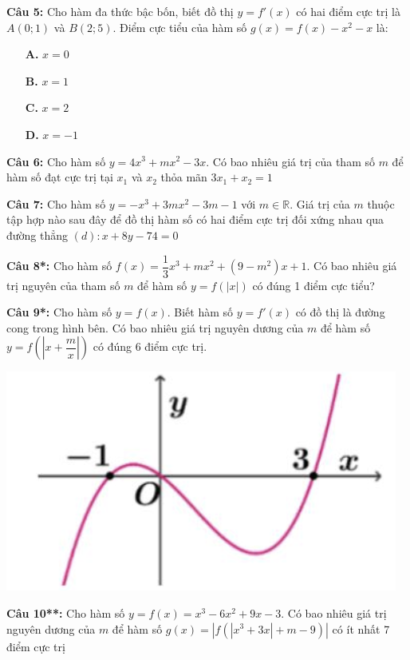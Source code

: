 \documentclass[12pt, a4paper]{article}
\begin{document}
\pagebreak		
	
		\textbf{Câu 5: } Cho hàm đa thức bậc bốn, biết đồ thị $y=f'(x)$ có hai điểm cực trị là $A(0;1)$ và $B(2;5)$. Điểm cực tiểu của hàm số $g(x)=f(x)-x^2-x$ là:
		\begin{multicols}{4}
			\begin{enumerate}
				\item[\textbf{A.}] $x=0$
				\item[\textbf{B.}] $x=1$
				\item[\textbf{C.}] $x=2$
				\item[\textbf{D.}] $x=-1$
			\end{enumerate}
		\end{multicols}
		
		\textbf{Câu 6: } Cho hàm số $y=4x^3+mx^2-3x$. Có bao nhiêu giá trị của tham số $m$ để hàm số đạt cực trị tại $x_1$ và $x_2$ thỏa mãn $3x_1+x_2=1$
		
		\textbf{Câu 7: } Cho hàm số $y=-x^3+3mx^2-3m-1$ với $m \in \mathbb{R}$. Giá trị của $m$ thuộc tập hợp nào sau đây để đồ thị hàm số có hai điểm cực trị đối xứng nhau qua đường thẳng $(d):x+8y-74=0$
		
		\textbf{Câu 8*: } Cho hàm số $f(x)=\dfrac{1}{3}x^3 +mx^2+(9-m^2)x+1$. Có bao nhiêu giá trị nguyên của tham số $m$ để hàm số $y=f(|x|)$ có đúng 1 điểm cực tiểu?
		
		\textbf{Câu 9*: } Cho hàm số $y=f(x)$. Biết hàm số $y=f'(x)$ có đồ thị là đường cong trong hình bên. Có bao nhiêu giá trị nguyên dương của $m$ để hàm số $y=f\left(\left|x+\dfrac{m}{x}\right|\right)$ có đúng 6 điểm cực trị.
			\begin{center}
				\includegraphics[scale=0.8]{../images/cuctri_cau9.png}
			\end{center}
		
		\textbf{Câu 10**: } Cho hàm số $y=f(x)=x^3-6x^2+9x-3$. Có bao nhiêu giá trị nguyên dương của $m$ để hàm số $g(x)=\left|f\left(\left|x^3+3x\right|+m-9\right)\right|$ có ít nhất 7 điểm cực trị
		
\end{document}

